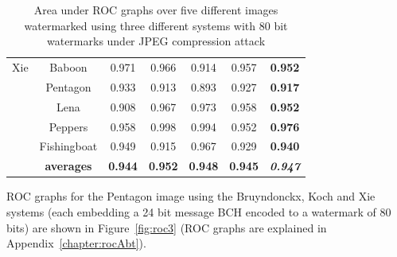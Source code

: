 \documentclass[12pt]{report}
\begin{document}
\begin{table}[!htb]
\begin{center}
\begin{tabular}{|c||c||c|c|c|c|c|}
                Xie     &               Baboon          & 0.971   & 0.966        & 0.914         & 0.957         &{\bf 0.952}\\ \cline{2-7}
                        &               Pentagon       & 0.933   & 0.913        & 0.893         & 0.927         &{\bf 0.917}\\ \cline{2-7}
                        &               Lena            & 0.908   & 0.967        & 0.973         & 0.958         &{\bf 0.952}\\ \cline{2-7}
                        &               Peppers         & 0.958   & 0.998        & 0.994         & 0.952         &{\bf 0.976}\\ \cline{2-7}
                        &               Fishingboat     & 0.949   & 0.915        & 0.967         & 0.929         &{\bf 0.940}\\ \cline{2-7}
                        &{\bf averages} & {\bf 0.944} & {\bf 0.952} & {\bf 0.948} & {\bf 0.945} &{\bf \emph{0.947}}\\ \hline

                \end{tabular}
		\caption{Area under ROC graphs over five different images watermarked using three different systems
		with 80 bit watermarks under JPEG compression attack}
                \label{bkzROCBKX}
        \end{center}
\end{table}
\normalsize
ROC graphs for the Pentagon image using the Bruyndonckx, Koch and Xie systems (each embedding a 
24 bit message BCH encoded to a watermark of 80 bits) are shown in Figure~\ref{fig:roc3} (ROC graphs
are explained in Appendix~\ref{chapter:rocAbt}).
\end{document}
